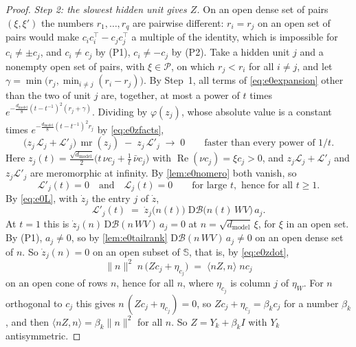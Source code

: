 \documentclass[10pt]{article}
\theoremstyle{definition}
\theoremstyle{remark}
\newcommand{\dm}{d_{\mathrm{model}}}
\newcommand{\Der}{\mathrm{D}}
\newcommand{\norm}[1]{\lVert #1\rVert}
\begin{document}
\begin{proof}
\emph{Step 2: the slowest hidden unit gives $Z$.} On an open dense set of pairs $(\xi, \xi')$ the numbers $r_1, \dots, r_q$ are pairwise different: $r_i = r_j$ on an open set of pairs would make $c_ic_i^\top - c_jc_j^\top$ a multiple of the identity, which is impossible for $c_i \neq \pm c_j$, and $c_i \neq c_j$ by (P1), $c_i \neq -c_j$ by (P2). Take a hidden unit $j$ and a nonempty open set of pairs, with $\xi \in \mathcal P$, on which $r_j < r_i$ for all $i \neq j$, and let $\gamma = \min\big(r_j, \min_{i\neq j}(r_i - r_j)\big)$. By Step~1, all terms of \eqref{eq:e0expansion} other than the two of unit $j$ are, together, at most a power of $t$ times $e^{-\frac{\dm}{8}(t - t^{-1})^2(r_j + \gamma)}$. Dividing by $\varphi(z_j)$, whose absolute value is a constant times $e^{-\frac{\dm}{8}(t - t^{-1})^2r_j}$ by \eqref{eq:e0zfacts},
\[
\big(z_j\,\mathcal L_j + \mathcal L'_j\big)\,\operatorname{mr}(z_j) \;-\; z_j\,\mathcal L'_j \;\longrightarrow\; 0 \qquad\text{faster than every power of } 1/t .
\]
Here $z_j(t) = \frac{\sqrt{\dm}}{2}\big(t\,\nu c_j + \frac1t\,\bar\nu c_j\big)$ with $\operatorname{Re}(\nu c_j) = \xi c_j > 0$, and $z_j\mathcal L_j + \mathcal L'_j$ and $z_j\mathcal L'_j$ are meromorphic at infinity. By \cref{lem:e0nomero} both vanish, so
\begin{equation}\label{eq:e0unitj}
\mathcal L'_j(t) = 0 \quad\text{and}\quad \mathcal L_j(t) = 0 \qquad\text{for large } t, \text{ hence for all } t \ge 1 .
\end{equation}
By \eqref{eq:e0L}, with $\dot z_j$ the entry $j$ of $\dot z$,
\[
\mathcal L'_j(t) \;=\; \dot z_j\big(n(t)\big)\;\Der\mathcal B\big(n(t)\,WV\big)\,a_j .
\]
At $t = 1$ this is $\dot z_j(n)\,\Der\mathcal B(n\,WV)\,a_j = 0$ at $n = \sqrt{\dm}\,\xi$, for $\xi$ in an open set. By (P1), $a_j \neq 0$, so by \cref{lem:e0tailrank} $\Der\mathcal B(n\,WV)\,a_j \neq 0$ on an open dense set of $n$. So $\dot z_j(n) = 0$ on an open subset of $\mathbb S$, that is, by \eqref{eq:e0zdot},
\[
\norm{n}^2\;n\,\big(Zc_j + \eta_{c_j}\big) \;=\; \langle nZ, n\rangle\;nc_j
\]
on an open cone of rows $n$, hence for all $n$, where $\eta_{c_j}$ is column $j$ of $\eta_W$. For $n$ orthogonal to $c_j$ this gives $n\,(Zc_j + \eta_{c_j}) = 0$, so $Zc_j + \eta_{c_j} = \beta_kc_j$ for a number $\beta_k$, and then $\langle nZ, n\rangle = \beta_k\norm{n}^2$ for all $n$. So $Z = Y_k + \beta_kI$ with $Y_k$ antisymmetric.


\end{proof}
\end{document}
